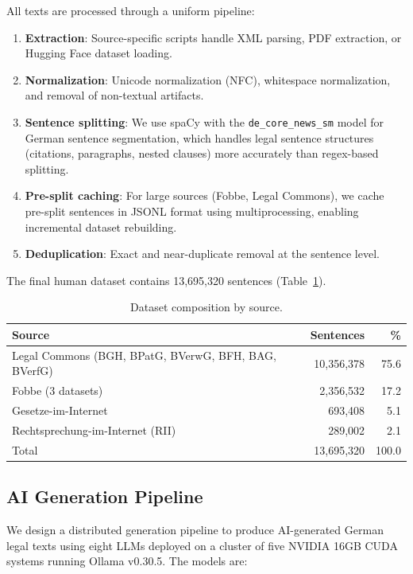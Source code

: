\documentclass[11pt,a4paper]{article}
\begin{document}
All texts are processed through a uniform pipeline:
\begin{enumerate}
  \item \textbf{Extraction}: Source-specific scripts handle XML parsing, PDF extraction, or Hugging Face dataset loading.
  \item \textbf{Normalization}: Unicode normalization (NFC), whitespace normalization, and removal of non-textual artifacts.
  \item \textbf{Sentence splitting}: We use spaCy with the {\tt de\_core\_news\_sm} model for German sentence segmentation, which handles legal sentence structures (citations, paragraphs, nested clauses) more accurately than regex-based splitting.
  \item \textbf{Pre-split caching}: For large sources (Fobbe, Legal Commons), we cache pre-split sentences in JSONL format using multiprocessing, enabling incremental dataset rebuilding.
  \item \textbf{Deduplication}: Exact and near-duplicate removal at the sentence level.
\end{enumerate}

The final human dataset contains 13,695,320 sentences (Table~\ref{tab:dataset}).

\begin{table}[t]
\centering
\caption{Dataset composition by source.}
\label{tab:dataset}
\begin{tabular}{lrr}
\toprule
Source & Sentences & \% \\
\midrule
Legal Commons (BGH, BPatG, BVerwG, BFH, BAG, BVerfG) & 10,356,378 & 75.6 \\
Fobbe (3 datasets) & 2,356,532 & 17.2 \\
Gesetze-im-Internet & 693,408 & 5.1 \\
Rechtsprechung-im-Internet (RII) & 289,002 & 2.1 \\
\midrule
Total & 13,695,320 & 100.0 \\
\bottomrule
\end{tabular}
\end{table}

\subsection{AI Generation Pipeline}

We design a distributed generation pipeline to produce AI-generated German legal texts using eight LLMs deployed on a cluster of five NVIDIA 16GB CUDA systems running Ollama v0.30.5. The models are:
\end{document}
